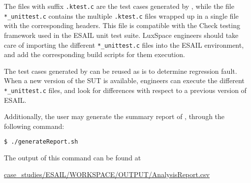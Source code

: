 The files with suffix \texttt{.ktest.c}  are the test cases generated by \SEMUS, while the file \texttt{*\_unittest.c} contains the multiple \texttt{.ktest.c} files wrapped up in a single file with the corresponding headers. This file is compatible with the Check testing framework used in the ESAIL unit test suite. LuxSpace engineers should take care of importing the different \texttt{*\_unittest.c} files into the ESAIL environment, and add the corresponding build scripts for them execution.

The test cases generated by \SEMUS can be reused as is to determine regression fault. When a new version of the SUT is available, engineers can execute the different \texttt{*\_unittest.c} files, and look for differences with respect to a previous version of ESAIL.

Additionally, the user may generate the summary report of \SEMUS, through the following command:

\begin{lstlisting}[language={}, label=listing:semus_results_1]
 $ ./generateReport.sh
\end{lstlisting}

The output of this command can be found at \begin{scriptsize}\url{case_studies/ESAIL/WORKSPACE/OUTPUT/AnalysisReport.csv}\end{scriptsize}
